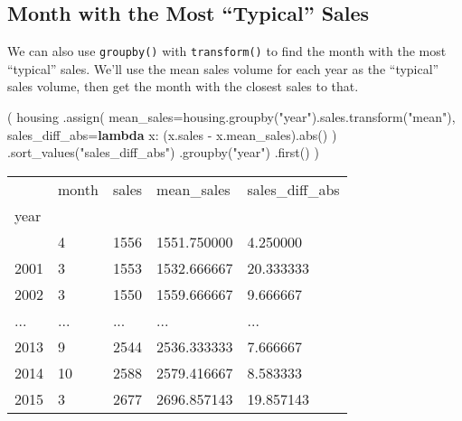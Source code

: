 \documentclass[
  letterpaper,
  DIV=11,
  numbers=noendperiod]{scrreprt}
\newenvironment{Shaded}{\begin{snugshade}}{\end{snugshade}}
\newcommand{\BuiltInTok}[1]{\textcolor[rgb]{0.00,0.23,0.31}{#1}}
\newcommand{\KeywordTok}[1]{\textcolor[rgb]{0.00,0.23,0.31}{\textbf{#1}}}
\newcommand{\NormalTok}[1]{\textcolor[rgb]{0.00,0.23,0.31}{#1}}
\newcommand{\OperatorTok}[1]{\textcolor[rgb]{0.37,0.37,0.37}{#1}}
\newcommand{\StringTok}[1]{\textcolor[rgb]{0.13,0.47,0.30}{#1}}
\begin{document}
\subsection{Month with the Most ``Typical''
Sales}\label{month-with-the-most-typical-sales}

We can also use \texttt{groupby()} with \texttt{transform()} to find the
month with the most ``typical'' sales. We'll use the mean sales volume
for each year as the ``typical'' sales volume, then get the month with
the closest sales to that.

\begin{Shaded}
\begin{Highlighting}[]
\NormalTok{(}
\NormalTok{housing}
\NormalTok{  .assign(}
\NormalTok{    mean\_sales}\OperatorTok{=}\NormalTok{housing.groupby(}\StringTok{"year"}\NormalTok{).sales.transform(}\StringTok{"mean"}\NormalTok{),}
\NormalTok{    sales\_diff\_abs}\OperatorTok{=}\KeywordTok{lambda}\NormalTok{ x: (x.sales }\OperatorTok{{-}}\NormalTok{ x.mean\_sales).}\BuiltInTok{abs}\NormalTok{()}
\NormalTok{    )}
\NormalTok{  .sort\_values(}\StringTok{"sales\_diff\_abs"}\NormalTok{)}
\NormalTok{  .groupby(}\StringTok{"year"}\NormalTok{)}
\NormalTok{  .first()}
\NormalTok{)}
\end{Highlighting}
\end{Shaded}

\begin{longtable}[]{@{}lllll@{}}
\toprule\noalign{}
& month & sales & mean\_sales & sales\_diff\_abs \\
year & & & & \\
\midrule\noalign{}
\endhead
\bottomrule\noalign{}
\endlastfoot
2000 & 4 & 1556 & 1551.750000 & 4.250000 \\
2001 & 3 & 1553 & 1532.666667 & 20.333333 \\
2002 & 3 & 1550 & 1559.666667 & 9.666667 \\
... & ... & ... & ... & ... \\
2013 & 9 & 2544 & 2536.333333 & 7.666667 \\
2014 & 10 & 2588 & 2579.416667 & 8.583333 \\
2015 & 3 & 2677 & 2696.857143 & 19.857143 \\
\end{longtable}
\end{document}
